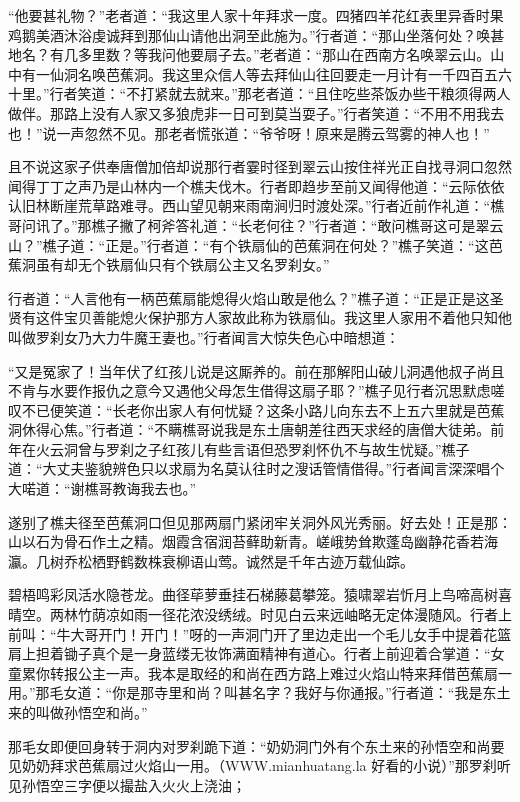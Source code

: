 \documentclass[12pt,UTF8]{ctexbook}
\begin{document}
“他要甚礼物？”老者道：“我这里人家十年拜求一度。四猪四羊花红表里异香时果鸡鹅美酒沐浴虔诚拜到那仙山请他出洞至此施为。”行者道：“那山坐落何处？唤甚地名？有几多里数？等我问他要扇子去。”老者道：“那山在西南方名唤翠云山。山中有一仙洞名唤芭蕉洞。我这里众信人等去拜仙山往回要走一月计有一千四百五六十里。”行者笑道：“不打紧就去就来。”那老者道：“且住吃些茶饭办些干粮须得两人做伴。那路上没有人家又多狼虎非一日可到莫当耍子。”行者笑道：“不用不用我去也！”说一声忽然不见。那老者慌张道：“爷爷呀！原来是腾云驾雾的神人也！”

且不说这家子供奉唐僧加倍却说那行者霎时径到翠云山按住祥光正自找寻洞口忽然闻得丁丁之声乃是山林内一个樵夫伐木。行者即趋步至前又闻得他道：“云际依依认旧林断崖荒草路难寻。西山望见朝来雨南涧归时渡处深。”行者近前作礼道：“樵哥问讯了。”那樵子撇了柯斧答礼道：“长老何往？”行者道：“敢问樵哥这可是翠云山？”樵子道：“正是。”行者道：“有个铁扇仙的芭蕉洞在何处？”樵子笑道：“这芭蕉洞虽有却无个铁扇仙只有个铁扇公主又名罗刹女。”

行者道：“人言他有一柄芭蕉扇能熄得火焰山敢是他么？”樵子道：“正是正是这圣贤有这件宝贝善能熄火保护那方人家故此称为铁扇仙。我这里人家用不着他只知他叫做罗刹女乃大力牛魔王妻也。”行者闻言大惊失色心中暗想道：

“又是冤家了！当年伏了红孩儿说是这厮养的。前在那解阳山破儿洞遇他叔子尚且不肯与水要作报仇之意今又遇他父母怎生借得这扇子耶？”樵子见行者沉思默虑嗟叹不已便笑道：“长老你出家人有何忧疑？这条小路儿向东去不上五六里就是芭蕉洞休得心焦。”行者道：“不瞒樵哥说我是东土唐朝差往西天求经的唐僧大徒弟。前年在火云洞曾与罗刹之子红孩儿有些言语但恐罗刹怀仇不与故生忧疑。”樵子道：“大丈夫鉴貌辨色只以求扇为名莫认往时之溲话管情借得。”行者闻言深深唱个大喏道：“谢樵哥教诲我去也。”

遂别了樵夫径至芭蕉洞口但见那两扇门紧闭牢关洞外风光秀丽。好去处！正是那：山以石为骨石作土之精。烟霞含宿润苔藓助新青。嵯峨势耸欺蓬岛幽静花香若海瀛。几树乔松栖野鹤数株衰柳语山莺。诚然是千年古迹万载仙踪。

碧梧鸣彩凤活水隐苍龙。曲径荜萝垂挂石梯藤葛攀笼。猿啸翠岩忻月上鸟啼高树喜晴空。两林竹荫凉如雨一径花浓没绣绒。时见白云来远岫略无定体漫随风。行者上前叫：“牛大哥开门！开门！”呀的一声洞门开了里边走出一个毛儿女手中提着花篮肩上担着锄子真个是一身蓝缕无妆饰满面精神有道心。行者上前迎着合掌道：“女童累你转报公主一声。我本是取经的和尚在西方路上难过火焰山特来拜借芭蕉扇一用。”那毛女道：“你是那寺里和尚？叫甚名字？我好与你通报。”行者道：“我是东土来的叫做孙悟空和尚。”

那毛女即便回身转于洞内对罗刹跪下道：“奶奶洞门外有个东土来的孙悟空和尚要见奶奶拜求芭蕉扇过火焰山一用。（WWW.mianhuatang.la 好看的小说）”那罗刹听见孙悟空三字便以撮盐入火火上浇油；
\end{document}
